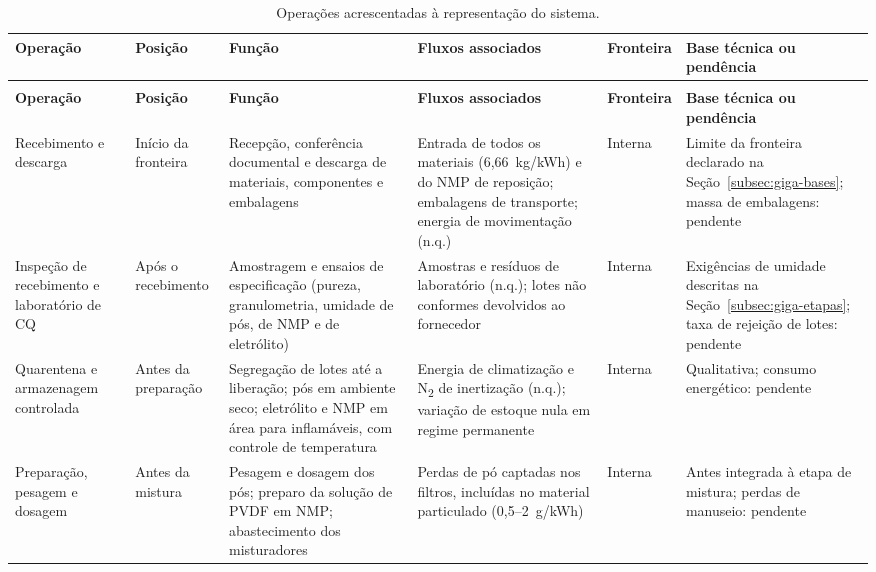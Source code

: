 \begin{small}
\setlength{\tabcolsep}{3pt}
\renewcommand{\arraystretch}{1.15}
\begin{longtable}{@{} >{\raggedright\arraybackslash}p{2.3cm} >{\raggedright\arraybackslash}p{1.9cm} >{\raggedright\arraybackslash}p{2.9cm} >{\raggedright\arraybackslash}p{3.0cm} >{\raggedright\arraybackslash}p{1.6cm} >{\raggedright\arraybackslash}p{2.9cm} @{}}
\caption{Operações acrescentadas à representação do sistema.}
\label{tab:giga-novas-etapas}\\
\toprule
\textbf{Operação} & \textbf{Posição} & \textbf{Função} & \textbf{Fluxos associados} & \textbf{Fronteira} & \textbf{Base técnica ou pendência} \\
\midrule
\endfirsthead
\multicolumn{6}{@{}l}{\footnotesize\textit{Continuação da Tabela~\ref{tab:giga-novas-etapas}}}\\
\toprule
\textbf{Operação} & \textbf{Posição} & \textbf{Função} & \textbf{Fluxos associados} & \textbf{Fronteira} & \textbf{Base técnica ou pendência} \\
\midrule
\endhead
\bottomrule
\endfoot
Recebimento e descarga & Início da fronteira & Recepção, conferência documental e descarga de materiais, componentes e embalagens & Entrada de todos os materiais (6,66~kg/kWh) e do NMP de reposição; embalagens de transporte; energia de movimentação (n.q.) & Interna & Limite da fronteira declarado na Seção~\ref{subsec:giga-bases}; massa de embalagens: pendente \\
\addlinespace
Inspeção de recebimento e laboratório de CQ & Após o recebimento & Amostragem e ensaios de especificação (pureza, granulometria, umidade de pós, de NMP e de eletrólito) & Amostras e resíduos de laboratório (n.q.); lotes não conformes devolvidos ao fornecedor & Interna & Exigências de umidade descritas na Seção~\ref{subsec:giga-etapas}; taxa de rejeição de lotes: pendente \\
\addlinespace
Quarentena e armazenagem controlada & Antes da preparação & Segregação de lotes até a liberação; pós em ambiente seco; eletrólito e NMP em área para inflamáveis, com controle de temperatura & Energia de climatização e N\textsubscript{2} de inertização (n.q.); variação de estoque nula em regime permanente & Interna & Qualitativa; consumo energético: pendente \\
\addlinespace
Preparação, pesagem e dosagem & Antes da mistura & Pesagem e dosagem dos pós; preparo da solução de PVDF em NMP; abastecimento dos misturadores & Perdas de pó captadas nos filtros, incluídas no material particulado (0,5--2~g/kWh) & Interna & Antes integrada à etapa de mistura; perdas de manuseio: pendente \\

\end{longtable}
\end{small}
